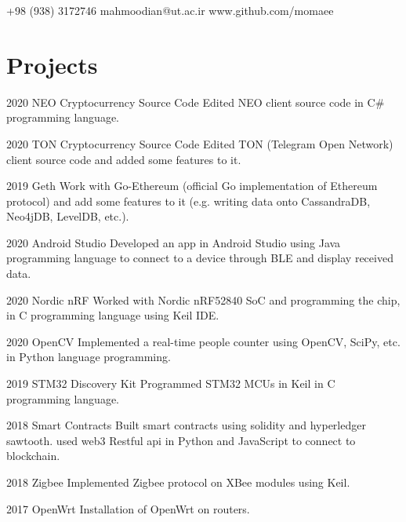 \documentclass{tccv}
\begin{document}
	{+98 (938) 3172746}
	{mahmoodian@ut.ac.ir}
	{www.github.com/momaee}
	
	\section{Projects}
	
	\begin{yearlist}
		
		\item{2020}
		{NEO Cryptocurrency Source Code}
		{Edited NEO client source code in C\# programming language.}
		
		\item{2020}
		{TON Cryptocurrency Source Code}
		{Edited TON (Telegram Open Network) client source code and added some features to it.}
		
		\item{2019}
		{Geth}
		{Work with Go-Ethereum (official Go implementation of Ethereum protocol) and add some features to it (e.g. writing data onto CassandraDB, Neo4jDB, LevelDB, etc.).}
		
		\item{2020}
		{Android Studio}
		{Developed an app in Android Studio using Java programming language to connect to a device through BLE and display received data.}
		
		\item{2020}
		{Nordic nRF}
		{Worked with Nordic nRF52840 SoC and programming the chip, in C programming language using Keil IDE.}
		
		\item{2020}
		{OpenCV}
		{Implemented a real-time people counter using OpenCV, SciPy, etc. in Python language programming.}
		
		\item{2019}
		{STM32 Discovery Kit}
		{Programmed STM32 MCUs in Keil in C programming language.}
		
		\item{2018}
		{Smart Contracts}
		{Built smart contracts using solidity and hyperledger sawtooth. used web3 Restful api in Python and JavaScript to connect to blockchain.}
		
		\item{2018}
		{Zigbee}
		{Implemented Zigbee protocol on XBee modules using Keil.}
		
		\item{2017}
		{OpenWrt}
		{Installation of OpenWrt on routers.}
	\end{yearlist}
	
\end{document}
